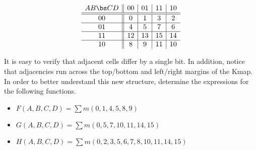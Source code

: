 $$ \begin{array} {c||c|c|c|c}
	AB \bs CD & 00 & 01 & 11 & 10 \\ \hline \hline
	00        & 0  & 1  & 3  & 2  \\ \hline
	01        & 4  & 5  & 7  & 6  \\ \hline
	11        & 12 & 13 & 15 & 14 \\ \hline
	10        & 8  & 9  & 11 & 10 \\ 
\end{array} $$

It is easy to verify that adjacent cells differ by a single bit.
In addition, notice that adjacencies run across the top/bottom 
and left/right margins of the Kmap.  In order to better 
understand this new structure, determine the \SOPmin
expressions for the following functions. 

\begin{itemize}
\item $F(A,B,C,D) = \sum m(0,1,4,5,8,9)$
\item $G(A,B,C,D) = \sum m(0,5,7,10,11,14,15)$
\item $H(A,B,C,D) = \sum m(0,2,3,5,6,7,8,10,11,14,15)$
\end{itemize}

